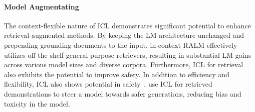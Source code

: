 \paragraph{Model Augmentating} The context-flexible nature of ICL demonstrates significant potential to enhance retrieval-augmented methods. By keeping the LM architecture unchanged and prepending grounding documents to the input, in-context RALM\citet{ram2023context} effectively utilizes off-the-shelf general-purpose retrievers, resulting in substantial LM gains across various model sizes and diverse corpora. Furthermore, ICL for retrieval also exhibits the potential to improve safety. In addition to efficiency and flexibility, ICL also shows potential in safety~\cite{dpicl}, \cite{meade2023using} use ICL for retrieved demonstrations to steer a model towards safer generations, reducing bias and toxicity in the model.

